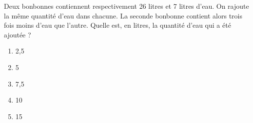 Deux bonbonnes contiennent respectivement 26 litres et 7 litres d'eau. On rajoute la même quantité d'eau dans chacune. La seconde bonbonne contient alors trois fois moins d'eau que l'autre. Quelle est, en litres, la quantité d'eau qui a été ajoutée ?
\begin{multicols}{5}
  \begin{enumerate}[A/]
  \item 2,5
  \item 5
  \item 7,5
  \item 10
  \item 15
  \end{enumerate}
\end{multicols}